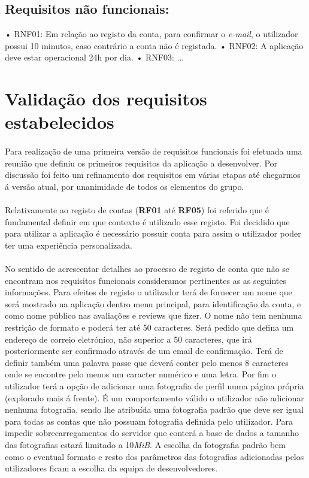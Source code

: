 \documentclass[a4paper,12pt]{scrreprt}
\begin{document}
            \subsection{Requisitos não funcionais:} 
            • RNF01: Em relação ao registo da conta, para confirmar o  \textit{e-mail}, o utilizador possui 10 minutos, caso contrário a conta não é registada. \newline
            • RNF02: A aplicação deve estar operacional 24h por dia.\newline
            • RNF03: ...
            
          
\newpage       
\section{Validação dos requisitos estabelecidos}
\paragraph{}
Para realização de uma primeira versão de requisitos funcionais foi efetuada uma reunião que definiu os primeiros requisitos da aplicação a desenvolver. Por discussão foi feito um refinamento dos requisitos em várias etapas até chegarmos á versão atual, por unanimidade de todos os elementos do grupo.
\paragraph{}
Relativamente ao registo de contas (\textbf{RF01} até \textbf{RF05}) foi referido que é fundamental definir em que contexto é utilizado esse registo. Foi decidido que para utilizar a aplicação é necessário possuir conta para assim o utilizador poder ter uma experiência personalizada. 
\paragraph{}
No sentido de acrescentar detalhes ao processo de registo de conta que não se encontram nos requisitos funcionais consideramos pertinentes as as seguintes informações.
Para efeitos de registo o utilizador terá de fornecer um nome que será mostrado na aplicação dentro menu principal, para identificação da conta, e como nome público nas avaliações e reviews que fizer. O nome não tem nenhuma restrição de formato e poderá ter até 50 caracteres.
Será pedido que defina um endereço de correio eletrónico, não superior a 50 caracteres, que irá posteriormente ser confirmado através de um email de confirmação.
Terá de definir também uma palavra passe que deverá conter pelo menos 8 caracteres onde se encontre pelo menos um caracter numérico e uma letra.
Por fim o utilizador terá a opção de adicionar uma fotografia de perfil numa página própria (explorado mais á frente). É um comportamento válido o utilizador não adicionar nenhuma fotografia, sendo lhe atribuída uma fotografia padrão que deve ser igual para todas as contas que não possuam fotografia definida pelo utilizador.
Para impedir sobrecarregamentos do servidor que conterá a base de dados a tamanho das fotografias estará limitado a 10\textit{MiB}.
A escolha da fotografia padrão bem como o eventual formato e resto dos parâmetros das fotografias adicionadas pelos utilizadores ficam a escolha da equipa de desenvolvedores.
\end{document}
